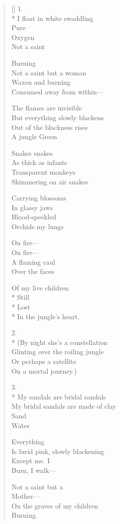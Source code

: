 \label{ch:neardeath}
\settowidth{\versewidth}{My bridal sandals are made of clay}
\begin{verse}[\versewidth]
1.\\*
I float in white swaddling\\
Pure\\
Oxygen\\
Not a saint

Burning\\
Not a saint but a woman\\
Waxen and burning\\
Consumed away from within---

The flames are invisible\\
But everything slowly blackens\\
Out of the blackness rises\\
A jungle \quad Green

Snakes   snakes\\
As thick as infants\\
Transparent monkeys\\
Shimmering on air \quad snakes

Carrying blossoms\\
In glassy jaws\\
Blood-speckled\\
Orchids \quad my lungs

On fire---\\
On fire---\\
A flaming caul\\
Over the faces

Of my live children\\*
Still\\*
Lost\\*
In the jungle's heart.


2.\\*
(By night she's a constellation\\
Glinting over the roiling jungle\\
Or perhaps a satellite\\
On a mortal journey.)

3.\\*
My sandals are bridal sandals\\
My bridal sandals are made of clay\\
Sand\\
Water

Everything\\
Is lurid pink, slowly blackening\\
Except me.  I\\
Burn, I walk---

Not a saint but a\\
Mother---\\
On the graves of my children\\
Burning.
\end{verse}

